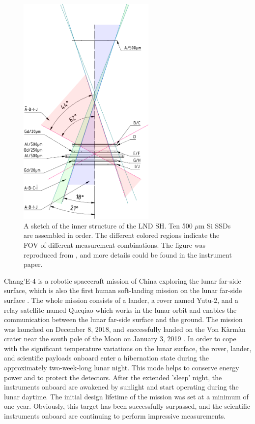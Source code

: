 \begin{figure}[!htb]
    \centering
    \includegraphics[width = 0.6\textwidth, height = 0.5 \textheight]{images/change4_lnd-c9_trigger-cones-colored.pdf}
    \caption[The inner structure of LND \ac{SH}]{A sketch of the inner structure of the \ac{LND} \ac{SH}. Ten 500 $\mu$m Si \acp{SSD} are assembled in order. The different colored regions indicate the \ac{FOV} of different measurement combinations. The figure was reproduced from \citet{Wimmer2020SSRv}, and more details could be found in the instrument paper.}
    \label{Fig:LND_sensor_head}
\end{figure}
Chang'E-4 is a robotic spacecraft mission of China exploring the lunar far-side surface, which is also the first human soft-landing mission on the lunar far-side surface \citep{Li2021SSRv}. The whole mission consists of a lander, a rover named Yutu-2, and a relay satellite named Queqiao which works in the lunar orbit and enables the communication between the lunar far-side surface and the ground. The mission was launched on December 8, 2018, and successfully landed on the Von K\`arm\`an crater near the south pole of the Moon on January 3, 2019 \citep{Wu2019NatGe}. In order to cope with the significant temperature variations on the lunar surface, the rover, lander, and scientific payloads onboard enter a hibernation state during the approximately two-week-long lunar night. This mode helps to conserve energy power and to protect the detectors. After the extended 'sleep' night, the instruments onboard are awakened by sunlight and start operating during the lunar daytime. The initial design lifetime of the mission was set at a minimum of one year. Obviously, this target has been successfully surpassed, and the scientific instruments onboard are continuing to perform impressive measurements.

